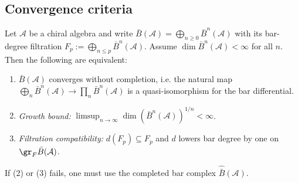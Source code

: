 \subsection{Convergence criteria}

\begin{theorem}\label{thm:bar-convergence}
Let $\mathcal{A}$ be a chiral algebra and write
$\bar{B}(\mathcal{A})=\bigoplus_{n\ge0}\bar{B}^n(\mathcal{A})$ with its bar-degree
filtration $F_p:=\bigoplus_{n\le p}\bar{B}^n(\mathcal{A})$.
Assume $\dim\bar{B}^n(\mathcal{A})<\infty$ for all $n$. Then the following are equivalent:
\begin{enumerate}
\item $\bar{B}(\mathcal{A})$ converges without completion, i.e. the natural map
$\bigoplus_n\bar{B}^n(\mathcal{A})\to\prod_n\bar{B}^n(\mathcal{A})$ is a
quasi-isomorphism for the bar differential.
\item \emph{Growth bound:}
$\limsup_{n\to\infty}\dim(\bar{B}^n(\mathcal{A}))^{1/n}<\infty$.
\item \emph{Filtration compatibility:}
$d(F_p)\subseteq F_p$ and $d$ lowers bar degree by one on $\gr_F\bar{B}(\mathcal{A})$.
\end{enumerate}
If (2) or (3) fails, one must use the completed bar complex
$\widehat{\bar{B}}(\mathcal{A})$.
\end{theorem}

